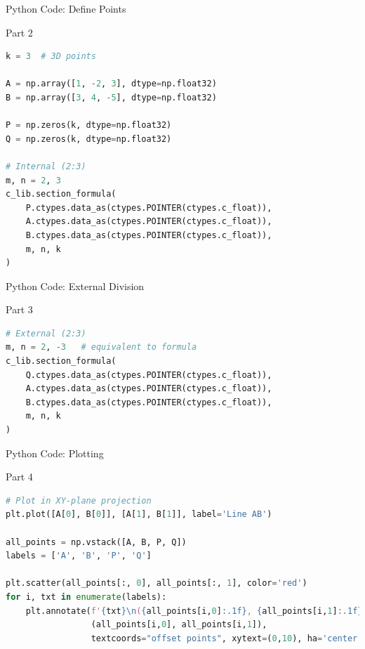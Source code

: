 \documentclass{beamer}
\begin{document}
\begin{frame}[fragile]{Python Code: Define Points}
\begin{block}{Part 2}
\begin{lstlisting}[language=Python, basicstyle=\ttfamily\small, keywordstyle=\color{blue}, frame=single]
k = 3  # 3D points

A = np.array([1, -2, 3], dtype=np.float32)
B = np.array([3, 4, -5], dtype=np.float32)

P = np.zeros(k, dtype=np.float32)
Q = np.zeros(k, dtype=np.float32)

# Internal (2:3)
m, n = 2, 3
c_lib.section_formula(
    P.ctypes.data_as(ctypes.POINTER(ctypes.c_float)),
    A.ctypes.data_as(ctypes.POINTER(ctypes.c_float)),
    B.ctypes.data_as(ctypes.POINTER(ctypes.c_float)),
    m, n, k
)
\end{lstlisting}
\end{block}
\end{frame}


\begin{frame}[fragile]{Python Code: External Division}
\begin{block}{Part 3}
\begin{lstlisting}[language=Python, basicstyle=\ttfamily\small, keywordstyle=\color{blue}, frame=single]
# External (2:3)
m, n = 2, -3   # equivalent to formula
c_lib.section_formula(
    Q.ctypes.data_as(ctypes.POINTER(ctypes.c_float)), 
    A.ctypes.data_as(ctypes.POINTER(ctypes.c_float)),
    B.ctypes.data_as(ctypes.POINTER(ctypes.c_float)),
    m, n, k
)
\end{lstlisting}
\end{block}
\end{frame}


\begin{frame}[fragile]{Python Code: Plotting}
\begin{block}{Part 4}
\begin{lstlisting}[language=Python, basicstyle=\ttfamily\small, keywordstyle=\color{blue}, frame=single]
# Plot in XY-plane projection
plt.plot([A[0], B[0]], [A[1], B[1]], label='Line AB')

all_points = np.vstack([A, B, P, Q])
labels = ['A', 'B', 'P', 'Q']

plt.scatter(all_points[:, 0], all_points[:, 1], color='red')
for i, txt in enumerate(labels):
    plt.annotate(f'{txt}\n({all_points[i,0]:.1f}, {all_points[i,1]:.1f})',
                 (all_points[i,0], all_points[i,1]),
                 textcoords="offset points", xytext=(0,10), ha='center')
\end{lstlisting}
\end{block}
\end{frame}
\end{document}
